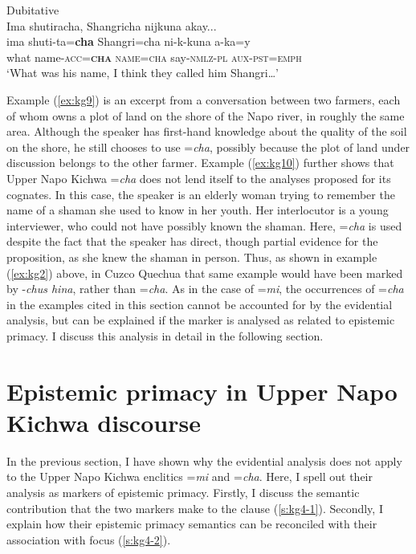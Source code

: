 \documentclass[output=paper]{langscibook}
\begin{document}
\newpage
\begin{exe}
	\ex Dubitative\label{ex:kg10}\\
	\glll Ima shutiracha, Shangricha nijkuna akay...\\
	ima shuti-ta=\textbf{cha} Shangri=cha ni-k-kuna a-ka=y\\
	what name-\textsc{acc}=\textbf{\textsc{cha}} \textsc{name}=\textsc{cha} say-\textsc{nmlz}-\textsc{pl} \textsc{aux}-\textsc{pst}=\textsc{emph}\\
	\trans ‘What was his name, I think they called him Shangri…’ \newline [in\_26052013\_02 132]
\end{exe}

Example ‎(\ref{ex:kg9}) is an excerpt from a conversation between two farmers, each of whom owns a plot of land on the shore of the Napo river, in roughly the same area. Although the speaker has first-hand knowledge about the quality of the soil on the shore, he still chooses to use =\textit{cha}, possibly because the plot of land under discussion belongs to the other farmer. Example ‎(\ref{ex:kg10}) further shows that Upper Napo Kichwa =\textit{cha} does not lend itself to the analyses proposed for its cognates. In this case, the speaker is an elderly woman trying to remember the name of a shaman she used to know in her youth. Her interlocutor is a young interviewer, who could not have possibly known the shaman. Here, =\textit{cha} is used despite the fact that the speaker has direct, though partial evidence for the proposition, as she knew the shaman in person. Thus, as shown in example ‎(\ref{ex:kg2}) above, in Cuzco Quechua that same example would have been marked by -\textit{chus hina}, rather than =\textit{cha}. As in the case of =\textit{mi}, the occurrences of =\textit{cha} in the examples cited in this section cannot be accounted for by the evidential analysis, but can be explained if the marker is analysed as related to epistemic primacy. I discuss this analysis in detail in the following section.

\section{Epistemic primacy in Upper Napo Kichwa discourse}\label{s:kg4}

In the previous section, I have shown why the evidential analysis does not apply to the Upper Napo Kichwa enclitics =\textit{mi} and =\textit{cha}. Here, I spell out their analysis as markers of epistemic primacy. Firstly, I discuss the semantic contribution that the two markers make to the clause (‎\ref{s:kg4-1}). Secondly, I explain how their epistemic primacy semantics can be reconciled with their association with focus (\ref{s:kg4-2}).
\end{document}
